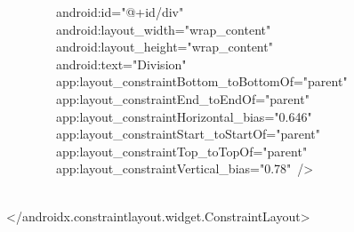 {\ttfamily\small \ \ \ \ \ \ \ \ android:id="@+id/div"} \\
{\ttfamily\small \ \ \ \ \ \ \ \ android:layout\_width="wrap\_content"} \\
{\ttfamily\small \ \ \ \ \ \ \ \ android:layout\_height="wrap\_content"} \\
{\ttfamily\small \ \ \ \ \ \ \ \ android:text="Division"} \\
{\ttfamily\small \ \ \ \ \ \ \ \ app:layout\_constraintBottom\_toBottomOf="parent"} \\
{\ttfamily\small \ \ \ \ \ \ \ \ app:layout\_constraintEnd\_toEndOf="parent"} \\
{\ttfamily\small \ \ \ \ \ \ \ \ app:layout\_constraintHorizontal\_bias="0.646"} \\
{\ttfamily\small \ \ \ \ \ \ \ \ app:layout\_constraintStart\_toStartOf="parent"} \\
{\ttfamily\small \ \ \ \ \ \ \ \ app:layout\_constraintTop\_toTopOf="parent"} \\
{\ttfamily\small \ \ \ \ \ \ \ \ app:layout\_constraintVertical\_bias="0.78"\ /\textgreater{}} \\
\strut \\
{\ttfamily\small \textless{}/androidx.constraintlayout.widget.ConstraintLayout\textgreater{}} \\
